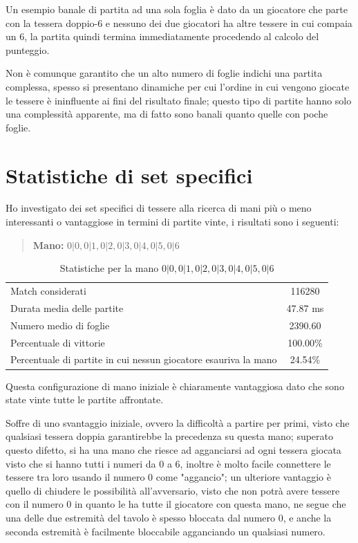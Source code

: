 \documentclass[a4paper,12pt]{report}
\begin{document}
Un esempio banale di partita ad una sola foglia è dato da un giocatore che parte con la tessera doppio-6 e nessuno dei due giocatori ha altre tessere in cui compaia un 6, la partita quindi termina immediatamente procedendo al calcolo del punteggio.


Non è comunque garantito che un alto numero di foglie indichi una partita complessa, spesso si presentano dinamiche per cui l'ordine in cui vengono giocate le tessere è ininfluente ai fini del risultato finale; questo tipo di partite hanno solo una complessità apparente, ma di fatto sono banali quanto quelle con poche foglie.


\section{Statistiche di set specifici}

Ho investigato dei set specifici di tessere alla ricerca di mani più o meno interessanti o vantaggiose in termini di partite vinte, i risultati sono i seguenti:

\begin{quote}
    \textbf{Mano:} \(0|0, 0|1, 0|2, 0|3, 0|4, 0|5, 0|6\)
\end{quote}

\begin{table}[h!]
    \centering
    \begin{tabular}{|l|c|}
        \hline
        Match considerati & 116280 \\
        Durata media delle partite & 47.87 ms \\
        Numero medio di foglie & 2390.60 \\
        Percentuale di vittorie & 100.00\% \\
        Percentuale di partite in cui nessun giocatore esauriva la mano & 24.54\% \\
        \hline
    \end{tabular}
    \caption{Statistiche per la mano \(0|0, 0|1, 0|2, 0|3, 0|4, 0|5, 0|6\)}
    \label{tab:stats_5}
\end{table}

Questa configurazione di mano iniziale è chiaramente vantaggiosa dato che sono state vinte tutte le partite affrontate.

Soffre di uno svantaggio iniziale, ovvero la difficoltà a partire per primi, visto che qualsiasi tessera doppia garantirebbe la precedenza su questa mano; superato questo difetto,
si ha una mano che riesce ad agganciarsi ad ogni tessera giocata visto che si hanno tutti i numeri da 0 a 6, inoltre è molto facile connettere le tessere tra loro usando il numero 0 come "aggancio";
un ulteriore vantaggio è quello di chiudere le possibilità all'avversario, visto che non potrà avere tessere con il numero 0 in quanto le ha tutte il giocatore con questa mano, ne segue che una delle 
due estremità del tavolo è spesso bloccata dal numero 0, e anche la seconda estremità è facilmente bloccabile agganciando un qualsiasi numero. 
\end{document}
